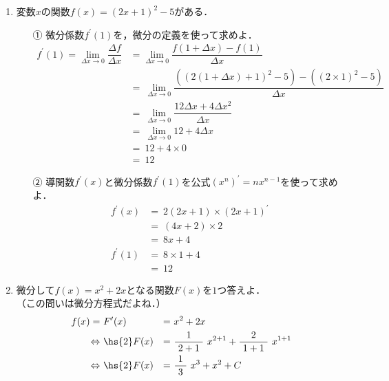 \documentclass[a4paper,11pt]{ltjsarticle}
\begin{document}
\begin{enumerate}
  \item 変数$x$の関数$f(x)=(2x+1)^2-5$がある．
  \begin{enumerate}
    \item[①] 微分係数$f^{\prime}(1)$を，微分の定義を使って求めよ．
    \begin{equation*}
      \begin{aligned}
        f^{\prime}(1) = \lim_{\Delta x \to 0}\dfrac{\Delta f}{\Delta x} &= \lim_{\Delta x \to 0}\dfrac{f(1+\Delta x)-f(1)}{\Delta x}\\
                                                                        &=\ \lim_{\Delta x \to 0}\dfrac{((2(1+\Delta x)+1)^{2}-5)-((2 \times 1)^{2}-5)}{\Delta x}\\
                                                                        &=\ \lim_{\Delta x \to 0}\dfrac{12 \Delta x+4 \Delta x^{2}}{\Delta x}\\
                                                                        &=\ \lim_{\Delta x \to 0}12+4 \Delta x\\
                                                                        &=\ 12+4 \times 0 \\
                                                                        &=\ 12
      \end{aligned}
    \end{equation*}
    \item[②] 導関数$f^{\prime}(x)$と微分係数$f^{\prime}(1)$を公式$(x^{n})^{\prime}=nx^{n-1}$を使って求めよ．
    \begin{equation*}
      \begin{aligned}
        f^{\prime}(x) &=\ 2(2x+1) \times (2x+1)^{\prime} \\
                      &=\ (4x+2) \times 2 \\
                      &=\ 8x+4 \\
        f^{\prime}(1) &=\ 8 \times 1 + 4 \\
                      &=\ 12
      \end{aligned}
    \end{equation*}
  \end{enumerate}
  \item 微分して$f(x)=x^{2}+2x$となる関数$F(x)$を$1$つ答えよ．\\（この問いは微分方程式だよね．）
  \begin{equation*}
    \begin{aligned}
                f(x)=\ & F^{\prime}(x) &=&\ x^{2}+2x \\
      \Leftrightarrow\ & \hs{2} F(x)   &=&\ \dfrac{1}{\ 2+1\ }\ x^{2+1}+\dfrac{2}{\ 1+1\ }\ x^{1+1} \\
      \Leftrightarrow\ & \hs{2} F(x)   &=&\ \dfrac{1}{\ 3\ }\ x^{3}+x^{2}+C \\
    \end{aligned}
  \end{equation*}


\end{enumerate}
\end{document}
